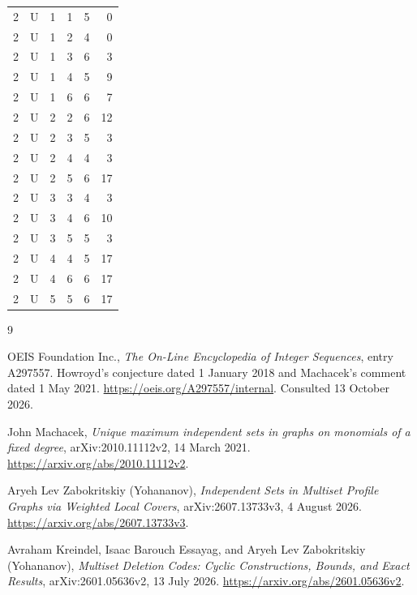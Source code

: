 \documentclass[11pt]{article}
\begin{document}
\begin{longtable}{cccccr}
2&U&1&1&5&0\\
2&U&1&2&4&0\\
2&U&1&3&6&3\\
2&U&1&4&5&9\\
2&U&1&6&6&7\\
2&U&2&2&6&12\\
2&U&2&3&5&3\\
2&U&2&4&4&3\\
2&U&2&5&6&17\\
2&U&3&3&4&3\\
2&U&3&4&6&10\\
2&U&3&5&5&3\\
2&U&4&4&5&17\\
2&U&4&6&6&17\\
2&U&5&5&6&17\\
\end{longtable}
\normalsize

\begin{thebibliography}{9}

OEIS Foundation Inc.,
\emph{The On-Line Encyclopedia of Integer Sequences},
entry A297557.
Howroyd's conjecture dated 1 January 2018 and Machacek's comment
dated 1 May 2021.
\url{https://oeis.org/A297557/internal}.
Consulted 13 October 2026.

John Machacek,
\emph{Unique maximum independent sets in graphs on monomials of a
fixed degree},
arXiv:2010.11112v2, 14 March 2021.
\url{https://arxiv.org/abs/2010.11112v2}.

Aryeh Lev Zabokritskiy (Yohananov),
\emph{Independent Sets in Multiset Profile Graphs via Weighted
Local Covers},
arXiv:2607.13733v3, 4 August 2026.
\url{https://arxiv.org/abs/2607.13733v3}.

Avraham Kreindel, Isaac Barouch Essayag, and
Aryeh Lev Zabokritskiy (Yohananov),
\emph{Multiset Deletion Codes: Cyclic Constructions, Bounds, and
Exact Results},
arXiv:2601.05636v2, 13 July 2026.
\url{https://arxiv.org/abs/2601.05636v2}.

\end{thebibliography}
\end{document}
